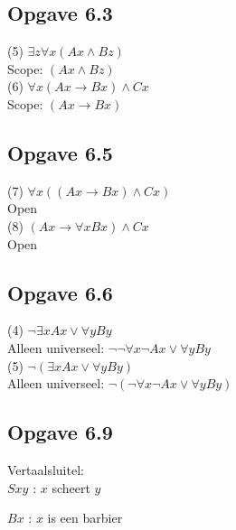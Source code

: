 \documentclass[11pt]{article}
\newcommand{\E}{\exists}
\newcommand{\A}{\forall}
\begin{document}

  \subsection*{Opgave 6.3}

  (5) $\E z\A x(Ax \wedge Bz)$ \\

  Scope: $(Ax \wedge Bz)$ \\

  (6) $\A x(Ax \rightarrow Bx) \wedge Cx$ \\

  Scope: $(Ax \rightarrow Bx)$


  \subsection*{Opgave 6.5}

  (7) $\A x((Ax \rightarrow Bx) \wedge Cx)$ \\

  Open \\

  (8) $(Ax \rightarrow \A xBx) \wedge Cx$ \\

  Open \\


  \subsection*{Opgave 6.6}

  (4) $\neg \E xAx \vee \A yBy$ \\

  Alleen universeel: $\neg \neg \A x \neg Ax \vee \A yBy$ \\

  (5) $\neg (\E xAx \vee \A yBy)$ \\

  Alleen universeel: $\neg (\neg \A x \neg Ax \vee \A yBy)$


  \subsection*{Opgave 6.9}

  Vertaalsluitel: \\

  $Sxy$ : $x$ scheert $y$

  $Bx$ : $x$ is een barbier
\end{document}
